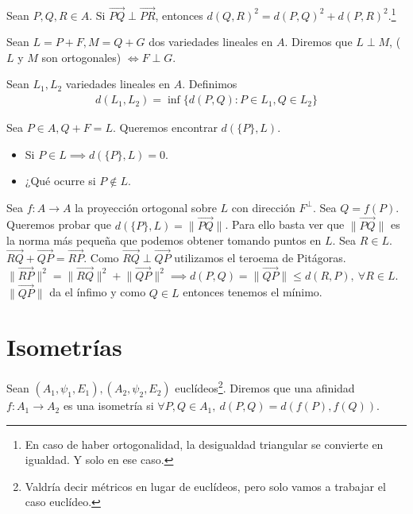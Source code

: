 \documentclass[14pt]{book}
\begin{document}
\begin{tm}[Pitágoras]
	Sean $P, Q, R \in A$. Si $\overrightarrow{PQ} \perp \overrightarrow{PR}$, entonces $d(Q, R)^2 = d(P,Q)^2 + d(P, R)^2$.\footnote{En caso de haber ortogonalidad, la desigualdad triangular se convierte en igualdad. Y solo en ese caso.}
\end{tm}

\begin{dfn}
	Sean $L = P + F, M = Q + G$ dos variedades lineales en $A$. Diremos que $L \perp M$, ($L$ y $M$ son ortogonales) $\iff F \perp G$.
\end{dfn}

\begin{dfn}
	Sean $L_1, L_2$ variedades lineales en $A$. Definimos
	\begin{align*}
		d(L_1, L_2) = \inf \{ d(P, Q): P \in L_1, Q \in L_2\}
	\end{align*}
\end{dfn}

\begin{ej}
	Sea $P \in A, Q + F = L$. Queremos encontrar $d(\{P\}, L)$.
	\begin{itemize}
		\item Si $P \in L \implies d(\{P\}, L) = 0$.
		\item ¿Qué ocurre si $P \not \in L$.
	\end{itemize}

Sea $f: A \to A$ la proyección ortogonal sobre $L$ con dirección $F^\perp$. Sea $Q = f(P)$. Queremos probar que $d(\{P\}, L) = \lVert \overrightarrow{PQ}\rVert$. Para ello basta ver que $\lVert \overrightarrow{PQ} \rVert$ es la norma más pequeña que podemos obtener tomando puntos en $L$. Sea $R \in L$. $\overrightarrow{RQ} + \overrightarrow{QP} = \overrightarrow{RP}$. Como $\overrightarrow{RQ} \perp \overrightarrow{QP}$ utilizamos el teroema de Pitágoras. $\lVert\overrightarrow{RP}\rVert^2 = \lVert\overrightarrow{RQ}\rVert^2 + \lVert\overrightarrow{QP}\rVert^2 \implies d(P, Q) = \lVert \overrightarrow{QP} \rVert \leq d(R, P),\ \forall R \in L$. $\lVert \overrightarrow{QP}\rVert$ da el ínfimo y como $Q \in L$ entonces tenemos el mínimo. 
\end{ej}

\section{Isometrías}
\begin{dfn}
	Sean $(A_1, \psi_1, E_1), (A_2, \psi_2, E_2)$ euclídeos\footnote{Valdría decir métricos en lugar de euclídeos, pero solo vamos a trabajar el caso euclídeo.}. Diremos que una afinidad $f:A_1 \to A_2$ es una isometría si $\forall P, Q \in A_1,\ d(P, Q) = d(f(P), f(Q))$.
\end{dfn}
\end{document}

